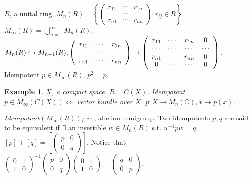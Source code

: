 \documentclass[12pt]{article}
\newtheorem{example}{Example}
\begin{document}
$R$, a unital ring. $M_n(R)=\left\{\left(\begin{array}{ccc} r_{11} & \cdots & r_{1n} \\ & \cdots & \\ r_{n1} & \cdots & r_{nn} \end{array}\right): r_{ij}\in R \right\}. $ $M_\infty(R)=\bigcup_{n=1}^\infty M_n(R) $. $M_n(R)\xhookrightarrow[]{} M_{n+1}(R), \left(\begin{array}{ccc}r_{11}&\cdots&r_{1n}\\&\cdots&\\r_{n1}&\cdots&r_{nn} \end{array} \right)\to \left(\begin{array}{cccc}r_{11}&\cdots&r_{1n}&0\\\cdots&\cdots&\cdots&\cdots\\r_{n1}&\cdots&r_{nn}&0\\0&\cdots&\cdots&0 \end{array} \right).$ Idempotent $p\in M_\infty(R)$, $p^2=p$.
\begin{example}
$X$, a compact space. $R=C(X)$. Idempotent $p\in M_\infty(C(X)) \iff $ vector bundle over $X$. $p:X\to M_n(\mathbb C),x\mapsto p(x)$.
\end{example}
$Idempotent(M_\infty(R))/\sim$, abelian semigroup. Two idempotents $p,q$ are said to be equivalent if $\exists$ an invertible $w\in M_n(R)$ s.t. $w^{-1}pw=q$. $[p]+[q]=\left[\left(\begin{array}{cc}p&0\\0&q \end{array} \right) \right]$. Notice that $\left(\begin{array}{cc}0&1\\1&0 \end{array} \right)^{-1}\left(\begin{array}{cc}p&0\\0&q \end{array} \right)\left(\begin{array}{cc}0&1\\1&0 \end{array} \right)=\left(\begin{array}{cc}q&0\\0&p \end{array} \right). $
\end{document}
